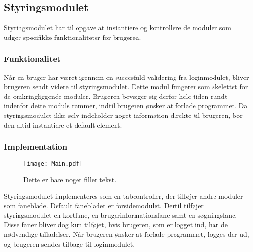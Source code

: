 \subsection{Styringsmodulet}
\label{sub:styringsmodul}

Styringsmodulet har til opgave at instantiere og kontrollere de moduler som udgør specifikke funktionaliteter for brugeren.

\subsubsection{Funktionalitet}
\label{ssub:hovedmodul_funktionalitet}

Når en bruger har været igennem en succesfuld validering fra loginmodulet, bliver brugeren sendt videre til styringsmodulet. Dette modul fungerer som skelettet for de omkringliggende moduler. Brugeren bevæger sig derfor hele tiden rundt indenfor dette moduls rammer, indtil brugeren ønsker at forlade programmet. Da styringsmodulet ikke selv indeholder noget information direkte til brugeren, bør den altid instantiere et default element.

\subsubsection{Implementation}
\label{ssub:hovedmodul_implementation}

\begin{figure}
  \centering
  \texttt{[image: Main.pdf]}
  \caption{Dette er bare noget filler tekst.}
\end{figure}


Styringsmodulet implementeres som en tabcontroller, der tilføjer andre moduler som faneblade. Default fanebladet er forsidemodulet. Dertil tilføjer styringsmodulet en kortfane, en brugerinformationsfane samt en søgningsfane. Disse faner bliver dog kun tilføjet, hvis brugeren, som er logget ind, har de nødvendige tilladelser. Når brugeren ønsker at forlade programmet, logges der ud, og brugeren sendes tilbage til loginmodulet.
